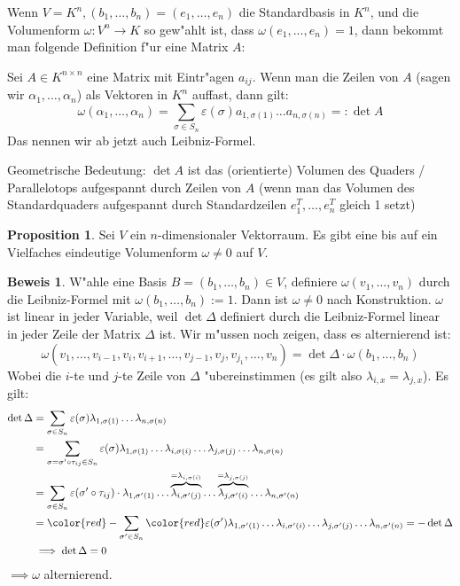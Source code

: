 \documentclass[oneside,fontsize=11pt,paper=a4,BCOR=0mm,DIV=12,automark,headsepline]{scrbook}
\newcommand{\gq}[1]{\glqq{}#1\grqq{}} %
\newcommand{\mcolor}[2][red]{\begingroup\color{#1}#2\endgroup }
\theoremstyle{remark}
\theoremstyle{definition}
\newtheorem*{proposition}{Proposition}
\theoremstyle{definition}
\newtheorem*{prof}{Beweis}
\theoremstyle{remark}
\begin{document}
Wenn \(V=K^n, (b_1,\dots,b_n) = (e_1,\dots,e_n)\) die Standardbasis in \(K^n\), und die Volumenform \(\omega:
V^n\to K\) so gew"ahlt ist, dass \(\omega(e_1,...,e_n)=1\), dann bekommt man
folgende Definition f"ur eine Matrix \(A\):

\begin{definition}{}{}
  Sei \(A\in K^{n\times n}\) eine Matrix mit Eintr"agen \(a_{ij}\). Wenn man die Zeilen von \(A\) (sagen wir \(\alpha_1,\dots, \alpha_n\)) als
  Vektoren in \(K^n\) auffast, dann gilt: \[\omega(\alpha_1,\dots,\alpha_n) = \sum_{\sigma\in S_n}{\varepsilon(\sigma)a_{1,\sigma(1)}\dots a_{n,\sigma(n)}} =: \det A \]
  Das nennen wir ab jetzt auch Leibniz-Formel.
\end{definition}

\begin{relation}
  Geometrische Bedeutung: \(\det A\) ist das (orientierte) Volumen des Quaders / Parallelotops aufgespannt durch Zeilen von \(A\) (wenn man das Volumen des \gq{Standardquaders} aufgespannt durch Standardzeilen \(e_1^T,\dots,e_n^T\) gleich 1 setzt)
\end{relation}
\begin{proposition}
  Sei \(V\) ein \(n\)-dimensionaler Vektorraum. Es gibt eine bis auf ein Vielfaches eindeutige Volumenform \(\omega \neq 0\) auf \(V\).
\end{proposition}
\begin{prof}
  W"ahle eine Basis \(B= (b_1,\dots,b_n) \in V\), definiere \(\omega(v_1,\dots,v_n)\) durch die Leibniz-Formel mit \(\omega(b_1,\dots,b_n):=1\). Dann ist \(\omega\neq 0\) nach Konstruktion. \(\omega\) ist linear in jeder Variable, weil \(\det\Delta \) definiert durch die Leibniz-Formel linear in jeder Zeile der Matrix \(\Delta\) ist. Wir m"ussen noch zeigen, dass es alternierend ist: \[\omega(v_1,\dots,v_{i-1},v_i,v_{i+1},\dots,v_{j-1},v_j,v_{j_1},\dots,v_n) = \det\Delta \cdot\omega(b_1,\dots,b_n) \] Wobei die \(i\)-te und \(j\)-te Zeile von \(\Delta\) "ubereinstimmen (es gilt also \(\lambda_{i,x}=\lambda_{j,x}\)). Es gilt:
  \begin{align*}
    \det\Delta &= \sum_{\sigma\in S_n}\varepsilon(\sigma)\lambda_{1,\sigma(1)}\dots\lambda_{n,\sigma(n)} \\
               &= \sum_{\sigma = \sigma'\circ\tau_{ij}\in S_n}\varepsilon(\sigma)\lambda_{1,\sigma(1)}\dots\lambda_{i,\sigma(i)}\dots\lambda_{j,\sigma(j)}\dots\lambda_{n,\sigma(n)} \\
               &= \sum_{\sigma\in S_n}\varepsilon(\sigma'\circ\tau_{ij})\cdot\lambda_{1,\sigma'(1)}\dots\overbrace{\lambda_{i,\sigma'(j)}}^{=\lambda_{i,\sigma(i)}}\dots\overbrace{\lambda_{j,\sigma'(i)}}^{=\lambda_{j,\sigma(j)}}\dots \lambda_{n,\sigma'(n)} \\
               &= \mcolor{-} \sum_{\sigma'\in S_n} \mcolor{\varepsilon(\sigma')} \lambda_{1,\sigma'(1)}\dots\lambda_{i,\sigma'(i)}\dots\lambda_{j,\sigma'(j)}\dots\lambda_{n,\sigma'(n)} = -\det \Delta \\
               &\implies \det \Delta = 0
  \end{align*}
  \(\implies\omega \) alternierend.
\end{prof}
\end{document}

